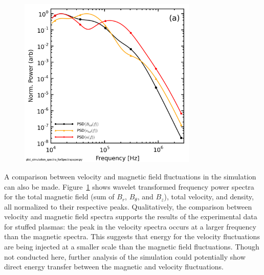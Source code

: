 \documentclass[aip,prl,amsmath,amssymb,reprint,superscriptaddress]{revtex4-1} %
\begin{document}
\begin{figure}[!htbp]
\centerline{
\includegraphics[width=8.5cm]{BfieldFlow_simulation_comparison}}
\caption{\label{fig:bflow_comp}}
\end{figure}

A comparison between velocity and magnetic field fluctuations in the simulation can also be made. Figure~\ref{fig:bflow_comp} shows wavelet transformed frequency power spectra for the total magnetic field (sum of $B_{r}$, $B_{\theta}$, and $B_{z}$), total velocity, and density, all normalized to their respective peaks. Qualitatively, the comparison between velocity and magnetic field spectra supports the results of the experimental data for stuffed plasmas: the peak in the velocity spectra occurs at a larger frequency than the magnetic spectra. This suggests that energy for the velocity fluctuations are being injected at a smaller scale than the magnetic field fluctuations. Though not conducted here, further analysis of the simulation could potentially show direct energy transfer between the magnetic and velocity fluctuations.
\end{document}
